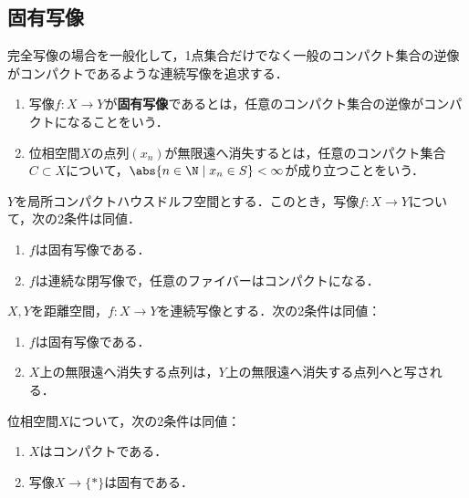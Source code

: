 \documentclass[uplatex,dvipdfmx]{jsreport}
\begin{document}
\subsection{固有写像}

\begin{tcolorbox}[colframe=ForestGreen, colback=ForestGreen!10!white,breakable,colbacktitle=ForestGreen!40!white,coltitle=black,fonttitle=\bfseries\sffamily,
title=]
    完全写像の場合を一般化して，1点集合だけでなく一般のコンパクト集合の逆像がコンパクトであるような連続写像を追求する．
\end{tcolorbox}

\begin{definition}\mbox{}
    \begin{enumerate}
        \item 写像$f:X\to Y$が\textbf{固有写像}であるとは，任意のコンパクト集合の逆像がコンパクトになることをいう．
        \item 位相空間$X$の点列$(x_n)$が無限遠へ消失するとは，任意のコンパクト集合$C\subset X$について，$\abs{n\in\N\mid x_n\in S}<\infty$が成り立つことをいう．
    \end{enumerate}
\end{definition}

\begin{proposition}
    $Y$を局所コンパクトハウスドルフ空間とする．このとき，写像$f:X\to Y$について，次の2条件は同値．
    \begin{enumerate}
        \item $f$は固有写像である．
        \item $f$は連続な閉写像で，任意のファイバーはコンパクトになる．
    \end{enumerate}
\end{proposition}

\begin{proposition}
    $X,Y$を距離空間，$f:X\to Y$を連続写像とする．次の2条件は同値：
    \begin{enumerate}
        \item $f$は固有写像である．
        \item $X$上の無限遠へ消失する点列は，$Y$上の無限遠へ消失する点列へと写される．
    \end{enumerate}
\end{proposition}

\begin{proposition}
    位相空間$X$について，次の2条件は同値：
    \begin{enumerate}
        \item $X$はコンパクトである．
        \item 写像$X\to\{*\}$は固有である．
    \end{enumerate}
\end{proposition}
\end{document}
